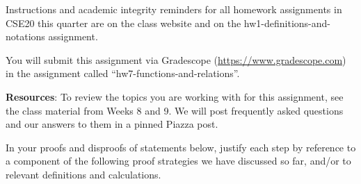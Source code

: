 \documentclass[12pt, oneside]{article}
\begin{document}
Instructions and academic integrity reminders for all homework assignments in 
CSE20 this quarter are on the class website and on the hw1-definitions-and-notations
assignment.

You will submit this assignment via Gradescope
(\href{https://www.gradescope.com}{https://www.gradescope.com}) 
in the assignment called ``hw7-functions-and-relations''.

{\bf Resources}: To review the topics you are working with 
for this assignment, see the class material from Weeks 8 and 9.
We will post frequently asked questions and our answers to them in a 
pinned Piazza post.


In your proofs and disproofs of statements below, justify each  step
by reference to  a component of the  following proof  strategies
we  have discussed so far, and/or to relevant definitions and calculations.
\end{document}
